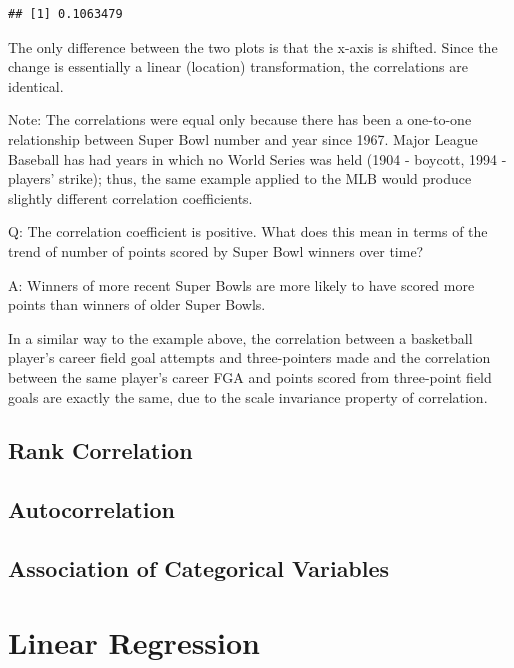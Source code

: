 \documentclass[
  11pt,
]{book}
\theoremstyle{definition}
\theoremstyle{definition}
\theoremstyle{definition}
\theoremstyle{definition}
\theoremstyle{remark}
\begin{document}
\begin{verbatim}
## [1] 0.1063479
\end{verbatim}

The only difference between the two plots is that the x-axis is shifted. Since the change is essentially a linear (location) transformation, the correlations are identical.

Note: The correlations were equal only because there has been a one-to-one relationship between Super Bowl number and year since 1967. Major League Baseball has had years in which no World Series was held (1904 - boycott, 1994 - players' strike); thus, the same example applied to the MLB would produce slightly different correlation coefficients.

Q: The correlation coefficient is positive. What does this mean in terms of the trend of number of points scored by Super Bowl winners over time?

A: Winners of more recent Super Bowls are more likely to have scored more points than winners of older Super Bowls.

In a similar way to the example above, the correlation between a basketball player's career field goal attempts and three-pointers made and the correlation between the same player's career FGA and points scored from three-point field goals are exactly the same, due to the scale invariance property of correlation.

\hypertarget{rank-correlation}{%
\section{Rank Correlation}\label{rank-correlation}}

\hypertarget{autocorrelation}{%
\section{Autocorrelation}\label{autocorrelation}}

\hypertarget{association-of-categorical-variables}{%
\section{Association of Categorical Variables}\label{association-of-categorical-variables}}

\hypertarget{linear-regression}{%
\chapter{Linear Regression}\label{linear-regression}}
\end{document}
